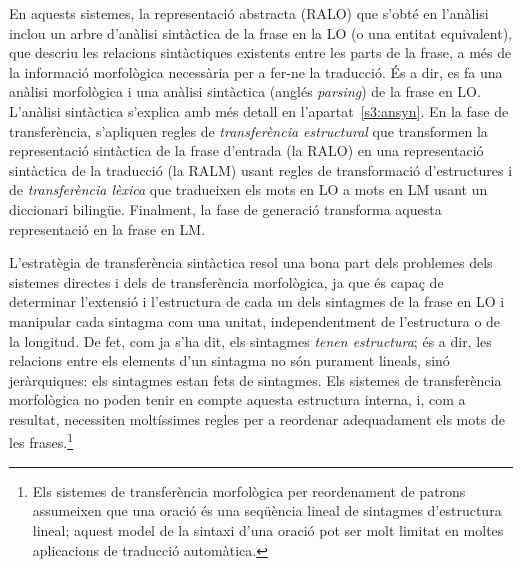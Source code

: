 En aquests sistemes, la representació abstracta (RALO) que s'obté en
l'anà\-li\-si inclou un arbre d'anàlisi sintàctica de la frase en la
LO (o una entitat equivalent), que descriu les relacions sintàctiques
existents entre les parts de la frase, a més de la informació
morfològica necessària per a fer-ne la traducció. És a dir, es fa una
anàlisi morfològica i una anàlisi sintàctica (anglés \emph{parsing})
de la frase en LO. L'anàlisi sintàctica s'explica amb més detall en
l'apartat~\ref{s3:ansyn}.  En la fase de transferència, s'apliquen
regles de \emph{transferència estructural} que transformen la
representació sintàctica de la frase d'entrada (la RALO) en una
representació sintàctica de la traducció (la RALM) usant regles de
transformació d'estructures i de \emph{transferència lèxica} que
tradueixen els mots en LO a mots en LM usant un diccionari bilingüe.
Finalment, la fase de generació transforma aquesta representació en la
frase en LM.

L'estratègia de transferència sintàctica resol una bona
part dels problemes dels sistemes directes i dels de transferència
morfològica, ja que és capaç de
determinar l'extensió i l'estructura de cada un dels sintagmes
de la frase en LO i manipular cada sintagma com una unitat, independentment
de l'estructura o de la longitud. 
De fet, com ja s'ha dit, els sintagmes \emph{tenen estructura}; és a
dir, les relacions entre els elements d'un sintagma no són purament
lineals, sinó jeràrquiques: els sintagmes estan fets de sintagmes.
Els sistemes de transferència morfològica no poden tenir 
en compte aquesta
estructura interna, i, com a resultat, necessiten moltíssimes regles
per a reordenar adequadament els mots de les frases.\footnote{Els sistemes de
transferència morfològica per reordenament de patrons assumeixen que
una oració és una seqüència lineal de sintagmes d'estructura
lineal; aquest model de la sintaxi d'una oració pot ser molt limitat en
moltes aplicacions de traducció automàtica.}


